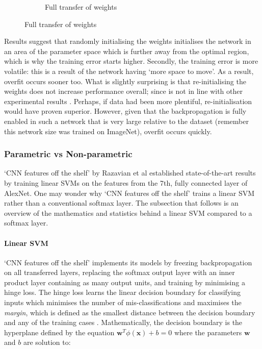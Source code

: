 \documentclass[a4paper,11pt]{article}
\begin{document}
\begin{figure}
\begin{minipage}[b]{\textwidth}
\begin{subfigure}{.5\textwidth}
        \caption{Full transfer of weights}\label{fig:2b}
      \end{subfigure} \par \vspace*{20pt} %
    \end{minipage}%
\end{figure}

Results suggest that randomly initialising the weights initialises the network in an area of the parameter space which is further away from the optimal region, which is why the training error starts higher. Secondly, the training error is more volatile: this is a result of the network having `more space to move'. As a result, overfit occurs sooner too. What is slightly surprising is that re-initialising the weights does not increase performance overall; since is not in line with other experimental results \cite{transfer-learning}. Perhaps, if data had been more plentiful, re-initialisation would have proven superior. However, given that the backpropagation is fully enabled in such a network that is very large relative to the dataset (remember this network size was trained on ImageNet), overfit occurs quickly.


\subsubsection{Parametric vs Non-parametric}

`CNN features off the shelf' by Razavian et al \cite{off-the-shelf} established state-of-the-art results by training linear SVMs on the features from the 7th, fully connected layer of AlexNet. One may wonder why `CNN features off the shelf' trains a linear SVM rather than a conventional softmax layer. The subsection that follows is an overview of the mathematics and statistics behind a linear SVM compared to a softmax layer.

\paragraph{Linear SVM}
`CNN features off the shelf' implements its models by freezing backpropagation on all transferred layers, replacing the softmax output layer with an inner product layer containing as many output units, and training by minimising a hinge loss. The hinge loss learns the linear decision boundary for classifying inputs which minimises the number of mis-classifications and maximises the \textit{margin}, which is defined as the smallest distance between the decision boundary and any of the training cases \cite{ML-book}. Mathematically, the decision boundary is the hyperplane defined by the equation $\textbf{w}^T \phi(\textbf{x}) + b = 0$ where the parameters $\textbf{w}$ and $b$ are solution to:
\end{document}
